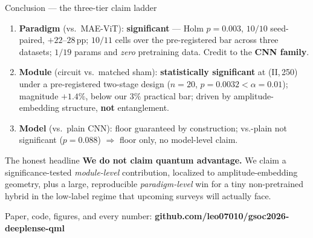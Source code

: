 \documentclass[aspectratio=169,10pt]{beamer}
\newcommand{\gd}[1]{\textcolor{good}{#1}}
\newcommand{\bd}[1]{\textcolor{bad}{#1}}
\begin{document}
\begin{frame}{Conclusion --- the three-tier claim ladder}
\footnotesize
\begin{enumerate}
\item \textbf{Paradigm} (vs.\ MAE-ViT): \gd{\textbf{significant}} ---
      Holm $p{=}0.003$, $10/10$ seed-paired, $+22$--$28$\,pp; $10/11$ cells over the
      pre-registered bar across three datasets; $1/19$ params and \emph{zero}
      pretraining data. Credit to the \textbf{CNN family}.
\item \textbf{Module} (circuit vs.\ matched sham): \gd{\textbf{statistically
      significant}} at (II,\,250) under a pre-registered two-stage design
      ($n{=}20$, $p{=}0.0032<\alpha{=}0.01$); magnitude $+1.4\%$,
      \alert{below our $3\%$ practical bar}; driven by amplitude-embedding
      structure, \textbf{not} entanglement.
\item \textbf{Model} (vs.\ plain CNN): \gd{floor guaranteed by construction};
      vs.-plain \bd{not significant} ($p{=}0.088$) $\Rightarrow$ floor only,
      no model-level claim.
\end{enumerate}
\normalsize
\smallskip

\begin{alertblock}{The honest headline}
\textbf{We do not claim quantum advantage.} We claim a significance-tested
\emph{module-level} contribution, localized to amplitude-embedding geometry, plus a
large, reproducible \emph{paradigm-level} win for a tiny non-pretrained hybrid in the
low-label regime that upcoming surveys will actually face.
\end{alertblock}

\centering\small
Paper, code, figures, and every number:
\textbf{github.com/leo07010/gsoc2026-deeplense-qml}
\end{frame}
\end{document}
